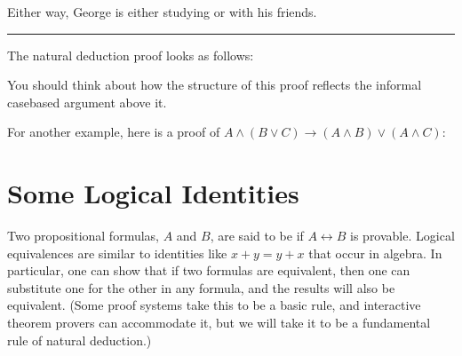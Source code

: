 \documentclass[letterpaper,10pt,english]{sphinxmanual}
\begin{document}
\sphinxAtStartPar
Either way, George is either studying or with his friends.


\bigskip\hrule\bigskip


\sphinxAtStartPar
The natural deduction proof looks as follows:



\begin{center}
\AXM{}
\AXM{}
\DP
\end{center}

\sphinxAtStartPar
You should think about how the structure of this proof reflects the informal case\sphinxhyphen{}based argument above it.

\sphinxAtStartPar
For another example, here is a proof of \(A \wedge (B \vee C) \to (A \wedge B) \vee (A \wedge C)\):



\begin{center}
\AXM{}
\AXM{}
\AXM{}
\AXM{}
\AXM{}
\DP
\end{center}


\section{Some Logical Identities}
\label{\detokenize{natural_deduction_for_propositional_logic:some-logical-identities}}
\sphinxAtStartPar
Two propositional formulas, \(A\) and \(B\), are said to be  if \(A \leftrightarrow B\) is provable. Logical equivalences are similar to identities like \(x + y = y + x\) that occur in algebra. In particular, one can show that if two formulas are equivalent, then one can substitute one for the other in any formula, and the results will also be equivalent. (Some proof systems take this to be a basic rule, and interactive theorem provers can accommodate it, but we will  take it to be a fundamental rule of natural deduction.)
\end{document}
